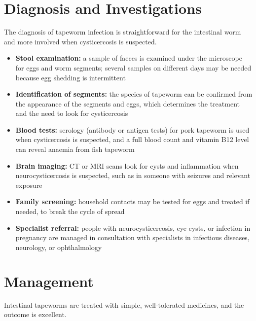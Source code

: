 \section*{Diagnosis and Investigations}
The diagnosis of tapeworm infection is straightforward for the intestinal worm and more involved when cysticercosis is suspected.

\begin{itemize}
    \item \textbf{Stool examination:} a sample of faeces is examined under the microscope for eggs and worm segments; several samples on different days may be needed because egg shedding is intermittent
    \item \textbf{Identification of segments:} the species of tapeworm can be confirmed from the appearance of the segments and eggs, which determines the treatment and the need to look for cysticercosis
    \item \textbf{Blood tests:} serology (antibody or antigen tests) for pork tapeworm is used when cysticercosis is suspected, and a full blood count and vitamin B12 level can reveal anaemia from fish tapeworm
    \item \textbf{Brain imaging:} CT or MRI scans look for cysts and inflammation when neurocysticercosis is suspected, such as in someone with seizures and relevant exposure
    \item \textbf{Family screening:} household contacts may be tested for eggs and treated if needed, to break the cycle of spread
    \item \textbf{Specialist referral:} people with neurocysticercosis, eye cysts, or infection in pregnancy are managed in consultation with specialists in infectious diseases, neurology, or ophthalmology
\end{itemize}

\section*{Management}
Intestinal tapeworms are treated with simple, well-tolerated medicines, and the outcome is excellent.

